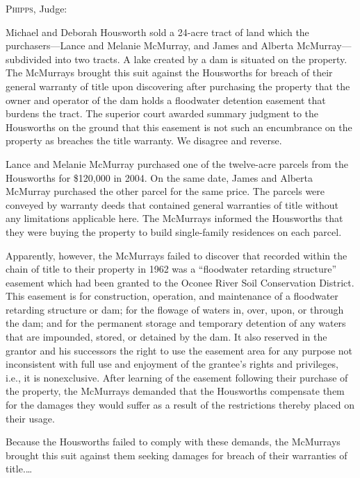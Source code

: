 

\opinion \textsc{Phipps}, Judge: 

Michael and Deborah Housworth sold a 24-acre tract of land which the
purchasers---Lance and Melanie McMurray, and James and Alberta McMurray---
subdivided into two tracts. A lake created by a dam is situated on the
property. The McMurrays brought this suit against the Housworths for breach of
their general warranty of title upon discovering after purchasing the property
that the owner and operator of the dam holds a floodwater detention easement
that burdens the tract. The superior court awarded summary judgment to the
Housworths on the ground that this easement is not such an encumbrance on the
property as breaches the title warranty. We disagree and reverse. 

Lance and Melanie McMurray purchased one of the twelve-acre parcels from the
Housworths for \$120,000 in 2004. On the same date, James and Alberta McMurray
purchased the other parcel for the same price. The parcels were conveyed by
warranty deeds that contained general warranties of title without any
limitations applicable here. The McMurrays informed the Housworths that they
were buying the property to build single-family residences on each parcel. 

Apparently, however, the McMurrays failed to discover that recorded within the
chain of title to their property in 1962 was a ``floodwater retarding
structure'' easement which had been granted to the Oconee River Soil
Conservation District. This easement is for construction, operation, and
maintenance of a floodwater retarding structure or dam; for the flowage of
waters in, over, upon, or through the dam; and for the permanent storage and
temporary detention of any waters that are impounded, stored, or detained by
the dam. It also reserved in the grantor and his successors the right to use
the easement area for any purpose not inconsistent with full use and enjoyment
of the grantee's rights and privileges, i.e., it is nonexclusive. After
learning of the easement following their purchase of the property, the
McMurrays demanded that the Housworths compensate them for the damages they
would suffer as a result of the restrictions thereby placed on their usage. 

Because the Housworths failed to comply with these demands, the McMurrays
brought this suit against them seeking damages for breach of their warranties
of title.\ldots

